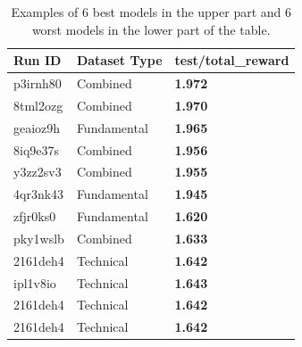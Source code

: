 \documentclass[../xlapes02]{subfiles}
\begin{document}
    \begin{table}[h!]
        \centering
        \begin{tabular}{|l|l|l|}
            \hline
            \textbf{Run ID} & \textbf{Dataset Type} & \textbf{test/total\_reward}                \\ \hline
            p3irnh80        & Combined              & \textcolor[RGB]{50,150,50}{\textbf{1.972}} \\ \hline
            8tml2ozg        & Combined              & \textcolor[RGB]{50,150,50}{\textbf{1.970}} \\ \hline
            geaioz9h        & Fundamental           & \textcolor[RGB]{50,150,50}{\textbf{1.965}} \\ \hline
            8iq9e37s        & Combined              & \textcolor[RGB]{50,150,50}{\textbf{1.956}} \\ \hline
            y3zz2sv3        & Combined              & \textcolor[RGB]{50,150,50}{\textbf{1.955}} \\ \hline
            4qr3nk43        & Fundamental           & \textcolor[RGB]{50,150,50}{\textbf{1.945}} \\
            \midrule
            \midrule
            zfjr0ks0        & Fundamental           & \textcolor[RGB]{150,50,50}{\textbf{1.620}} \\ \hline
            pky1wslb        & Combined              & \textcolor[RGB]{150,50,50}{\textbf{1.633}} \\ \hline
            2161deh4        & Technical             & \textcolor[RGB]{150,50,50}{\textbf{1.642}} \\ \hline
            ipl1v8io        & Technical             & \textcolor[RGB]{150,50,50}{\textbf{1.643}} \\ \hline
            2161deh4        & Technical             & \textcolor[RGB]{150,50,50}{\textbf{1.642}} \\ \hline
            2161deh4        & Technical             & \textcolor[RGB]{150,50,50}{\textbf{1.642}} \\ \hline
        \end{tabular}
        \caption{Examples of 6 best models in the upper part and 6 worst models in the lower part of the table.}
        \label{tab:datasets-comparison}
    \end{table}
\end{document}
